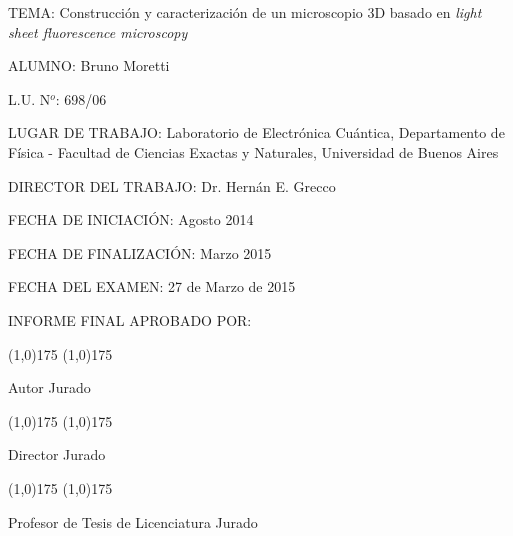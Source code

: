 



%


\thispagestyle{empty}

TEMA: Construcción y caracterización de un microscopio 3D basado en \textit{light sheet fluorescence microscopy}

      

\vspace{12pt}

ALUMNO: Bruno Moretti

\vspace{12pt}

L.U. N$^o$: 698/06

\vspace{12pt}

LUGAR DE TRABAJO: Laboratorio de Electrónica Cuántica, Departamento de Física - Facultad de Ciencias  Exactas y Naturales, Universidad de Buenos Aires

\vspace{12pt}

DIRECTOR DEL TRABAJO: Dr. Hernán E. Grecco

\vspace{12pt}

FECHA DE INICIACIÓN: Agosto 2014

\vspace{12pt}

FECHA DE FINALIZACIÓN: Marzo 2015

\vspace{12pt}

FECHA DEL EXAMEN: 27 de Marzo de 2015

\vspace{12pt}

INFORME FINAL APROBADO POR:

\vspace{2.5cm}

\line(1,0){175} \hspace{60pt} \line(1,0){175}

Autor \hspace{205pt} Jurado

\vspace{2cm}

\line(1,0){175} \hspace{60pt} \line(1,0){175}

Director \hspace{195pt} Jurado

\vspace{2cm}

\line(1,0){175} \hspace{60pt} \line(1,0){175}

Profesor de Tesis de Licenciatura \hspace{75pt} Jurado

%
